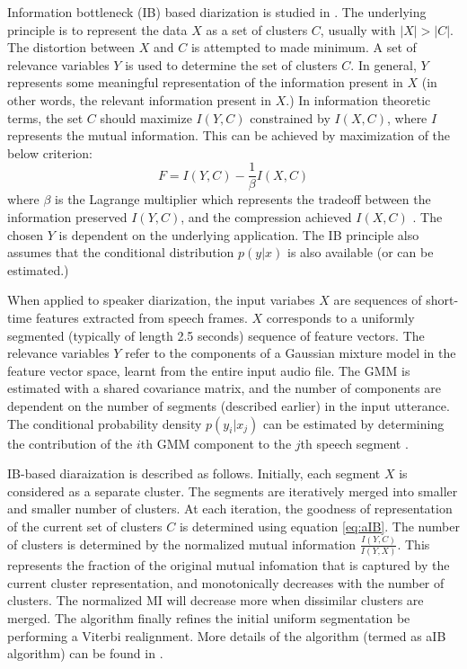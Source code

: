 \documentclass[conference]{IEEEtran}
\begin{document}
Information bottleneck (IB) based diarization is studied in
\cite{deepuThesis}. The underlying principle is to represent the data $X$ as a
set of clusters $C$, usually with $|X|>|C|$. The distortion between $X$ and $C$
is attempted to made minimum. A set of relevance variables $Y$ is used to
determine the set of clusters $C$. In general, $Y$ represents some meaningful
representation of the information present in $X$ (in other words, the relevant
information present in $X$.) In information theoretic terms, the set $C$ 
should maximize $I(Y,C)$ constrained by
$I(X,C)$, where $I$ represents the mutual information. This can be achieved by
maximization of the below criterion:
\begin{equation}
\label{eq:aIB}
F = I(Y,C) - \frac{1}{\beta}I(X,C) 
\end{equation}
where $\beta$ is the Lagrange multiplier which represents the tradeoff between
the information preserved $I(Y,C)$, and the compression achieved $I(X,C)$
\cite{deepuThesis}. The chosen $Y$ is dependent on the underlying
application. The IB principle also assumes that the conditional distribution
$p(y|x)$ is also available (or can be estimated.)

When applied to speaker diarization, the input variabes $X$ are sequences of
short-time features extracted from speech frames. $X$ corresponds to a uniformly
segmented (typically of length 2.5 seconds) sequence of feature vectors. The
relevance variables $Y$ refer to the components of a Gaussian mixture model in
the feature vector space, learnt from the entire input audio file. The GMM is
estimated with a shared covariance matrix, and the number of components are
dependent on the number of segments (described earlier) in the input utterance.
The conditional probability density $p(y_i|x_j)$ can be estimated by determining
the contribution of the $i$th GMM component to the $j$th speech segment
\cite{deepuThesis}.

IB-based diaraization is described as follows. Initially, each segment $X$ is
considered as a separate cluster. The segments are iteratively merged into
smaller and smaller number of clusters. At each iteration, the goodness of
representation of the current set of clusters $C$ is determined using equation
\ref{eq:aIB}. The number of clusters is determined by the normalized mutual
information $\frac{I(Y,C)}{I(Y,X)}$. This represents the fraction of the
original mutual infomation that is captured by the current cluster
representation, and monotonically decreases with the number of clusters.  The
normalized MI will decrease more when dissimilar clusters are merged. The
algorithm finally refines the initial uniform segmentation be performing a
Viterbi realignment. More details of the algorithm (termed as aIB algorithm)
can be found in \cite{deepuThesis}.
\end{document}
